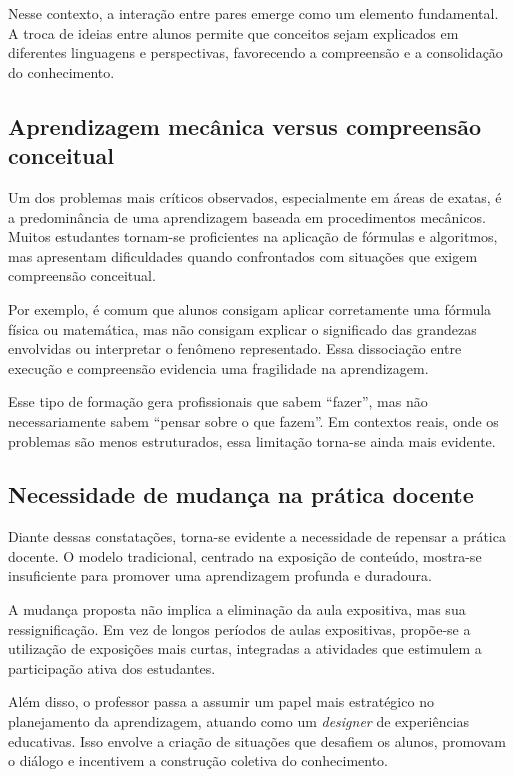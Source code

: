 Nesse contexto, a interação entre pares emerge como um elemento fundamental. A troca de ideias entre alunos permite que conceitos sejam explicados em diferentes linguagens e perspectivas, favorecendo a compreensão e a consolidação do conhecimento.

\subsection{Aprendizagem mecânica versus compreensão conceitual}

Um dos problemas mais críticos observados, especialmente em áreas de exatas, é a predominância de uma aprendizagem baseada em procedimentos mecânicos. Muitos estudantes tornam-se proficientes na aplicação de fórmulas e algoritmos, mas apresentam dificuldades quando confrontados com situações que exigem compreensão conceitual.

Por exemplo, é comum que alunos consigam aplicar corretamente uma fórmula física ou matemática, mas não consigam explicar o significado das grandezas envolvidas ou interpretar o fenômeno representado. Essa dissociação entre execução e compreensão evidencia uma fragilidade na aprendizagem.

Esse tipo de formação gera profissionais que sabem “fazer”, mas não necessariamente sabem “pensar sobre o que fazem”. Em contextos reais, onde os problemas são menos estruturados, essa limitação torna-se ainda mais evidente.

\subsection{Necessidade de mudança na prática docente}

Diante dessas constatações, torna-se evidente a necessidade de repensar a prática docente. O modelo tradicional, centrado na exposição de conteúdo, mostra-se insuficiente para promover uma aprendizagem profunda e duradoura.

A mudança proposta não implica a eliminação da aula expositiva, mas sua ressignificação. Em vez de longos períodos de aulas expositivas, propõe-se a utilização de exposições mais curtas, integradas a atividades que estimulem a participação ativa dos estudantes.

Além disso, o professor passa a assumir um papel mais estratégico no planejamento da aprendizagem, atuando como um \textit{designer} de experiências educativas. Isso envolve a criação de situações que desafiem os alunos, promovam o diálogo e incentivem a construção coletiva do conhecimento.

